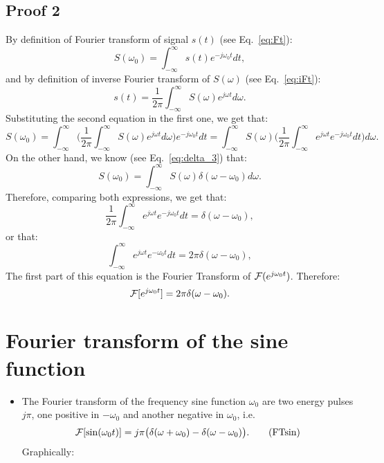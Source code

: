 \subsection*{Proof 2}
By definition of Fourier transform of signal $s(t)$ (see Eq.~\ref{eq:Ft}):
\begin{equation}
  S(\omega_0) = \int_{-\infty}^\infty s(t)e^{-j\omega_0t}dt,
\end{equation}
and by definition of inverse Fourier transform of $S(\omega)$ (see
Eq.~\ref{eq:iFt}):
\begin{equation}
  s(t) = \frac{1}{2\pi} \int_{-\infty}^\infty S(\omega)e^{j\omega t}d\omega.
\end{equation}
Substituting the second equation in the first one, we get that:
\begin{equation}
  S(\omega_0) = \int_{-\infty}^\infty \big( \frac{1}{2\pi} \int_{-\infty}^\infty S(\omega)e^{j\omega t}d\omega \big) e^{-j\omega_0t}dt = \int_{-\infty}^\infty S(\omega) \big( \frac{1}{2\pi} \int_{-\infty}^\infty e^{j\omega t}e^{-j\omega_0 t}dt\big) d\omega.
\end{equation}
On the other hand, we know (see Eq.~\ref{eq:delta_3}) that:
\begin{equation}
  S(\omega_0) = \int_{-\infty}^\infty S(\omega)\delta(\omega-\omega_0)d\omega.
\end{equation}
Therefore, comparing both expressions, we get that:
\begin{equation}
  \frac{1}{2\pi} \int_{-\infty}^\infty e^{j\omega t}e^{-j\omega_0t}dt = \delta(\omega-\omega_0),
\end{equation}
or that:
\begin{equation}
  \int_{-\infty}^\infty e^{j\omega t}e^{-\omega_0 t}dt = 2\pi\delta(\omega-\omega_0),
\end{equation}
The first part of this equation is the Fourier Transform of ${\cal F}(e^{j\omega_0 t})$. Therefore:
\begin{equation*}
  {\cal F}[e^{j\omega_0t}] = 2\pi\delta(\omega-\omega_0).
\end{equation*}

\section{Fourier transform of the sine function}
\begin{itemize}
\item The Fourier transform of the frequency sine function $\omega_0$ are two
  energy pulses $j\pi$, one positive in $-\omega_0$ and another negative in $\omega_0$,
  i.e.
  \begin{equation}
    {\cal F}[\sin(\omega_0t)] = j\pi\big(\delta(\omega+\omega_0)-\delta(\omega-\omega_0)\big).
    \tag{FTsin}
    \label{eq:TFsen}
  \end{equation}
  Graphically:
\end{itemize}

